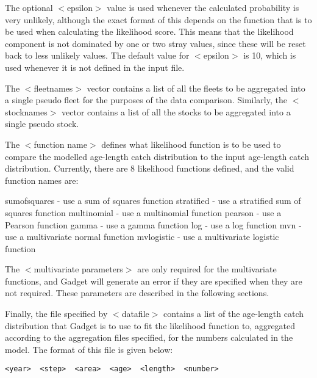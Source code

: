 \documentclass[10pt,twoside]{book}
\begin{document}
\bigskip
The optional $<$epsilon$>$ value is used whenever the calculated probability is very unlikely, although the exact format of this depends on the function that is to be used when calculating the likelihood score.  This means that the likelihood component is not dominated by one or two stray values, since these will be reset back to less unlikely values.  The default value for $<$epsilon$>$ is 10, which is used whenever it is not defined in the input file.

\bigskip
The $<$fleetnames$>$ vector contains a list of all the fleets to be aggregated into a single pseudo fleet for the purposes of the data comparison.  Similarly, the $<$stocknames$>$ vector contains a list of all the stocks to be aggregated into a single pseudo stock.

\bigskip
The $<$function name$>$ defines what likelihood function is to be used to compare the modelled age-length catch distribution to the input age-length catch distribution.  Currently, there are 8 likelihood functions defined, and the valid function names are:

\bigskip
sumofsquares - use a sum of squares function\newline
stratified - use a stratified sum of squares function\newline
multinomial - use a multinomial function\newline
pearson - use a Pearson function\newline
gamma - use a gamma function\newline
log - use a log function\newline
mvn - use a multivariate normal function\newline
mvlogistic - use a multivariate logistic function

\bigskip
The $<$multivariate parameters$>$ are only required for the multivariate functions, and Gadget will generate an error if they are specified when they are not required.  These parameters are described in the following sections.

\bigskip
Finally, the file specified by $<$datafile$>$ contains a list of the age-length catch distribution that Gadget is to use to fit the likelihood function to, aggregated according to the aggregation files specified, for the numbers calculated in the model.  The format of this file is given below:

{\small\begin{verbatim}
<year>  <step>  <area>  <age>  <length>  <number>
\end{verbatim}}
\end{document}
